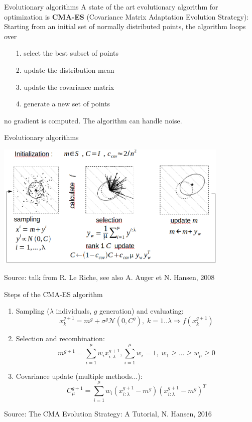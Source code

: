 \documentclass{beamer}
\begin{document}
\begin{frame}{Evolutionary algorithms}
A state of the art evolutionary algorithm for optimization is \textbf{CMA-ES} (Covariance Matrix Adaptation Evolution Strategy): \\
\vspace{3mm}
Starting from an initial set of normally distributed points, the algorithm loops over
\begin{itemize}
	\item[1.] select the best subset of points
	\item[2.] update the distribution mean
	\item[3.] update the covariance matrix
	\item[4.] generate a new set of points
\end{itemize}
\vspace{5mm}
 no gradient is computed. The algorithm can handle noise.\\
\end{frame}

\begin{frame}{Evolutionary algorithms}
\begin{center}
\includegraphics[height=6cm]{figures/RLRcmaes}
\end{center}
\small Source: talk from R. Le Riche, see also A. Auger et N. Hansen, 2008 
\end{frame}

\begin{frame}{Steps of the CMA-ES algorithm}
\begin{enumerate}
	\item Sampling ($\lambda$ individuals, $g$ generation) and evaluating:
	\[
	x_k^{g+1}=m^g+\sigma^g\mathcal{N}(0,C^g),\;k=1..\lambda\Rightarrow f(x_k^{g+1})
	\]
	\item Selection and recombination:
	\[
	m^{g+1}=\sum_{i=1}^\mu{w_ix_{i:\lambda}^{g+1}},\sum_{i=1}^\mu{w_i}=1,\;w_1\geq...\geq w_\mu\geq 0
	\]
	\item Covariance update (multiple methods...):
	\[
	C_\mu^{g+1}=\sum_{i=1}^\mu{w_i(x_{i:\lambda}^{g+1}-m^g)(x_{i:\lambda}^{g+1}-m^g)^T}
	\]
\end{enumerate}
\small Source: The CMA Evolution Strategy: A Tutorial, N. Hansen, 2016 
\end{frame}
\end{document}
